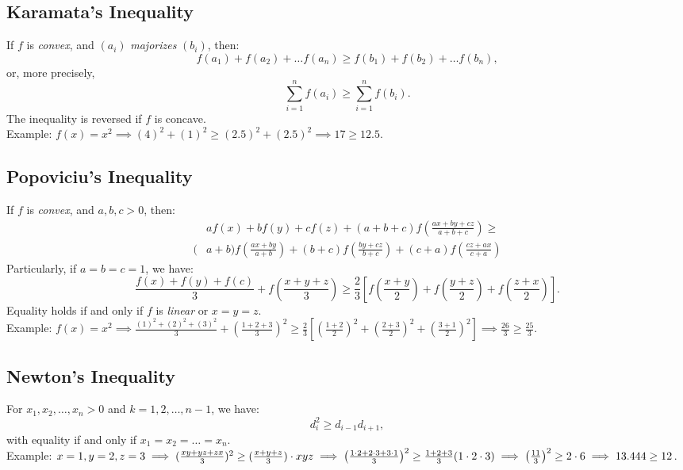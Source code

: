 \documentclass[a4paper,11pt]{article}
\begin{document}
\subsection{Karamata's Inequality}
\begin{tcolorbox}
    If $f$ is \emph{convex}, and $(a_i)$ \emph{majorizes} $(b_i)$, then:
    \[
    f(a_1) + f(a_2) + \dots f(a_n) \geq f(b_1) + f(b_2) + \dots f(b_n),
    \]
    or, more precisely,
    \[
    \sum_{i=1}^n f(a_i) \geq \sum_{i=1}^n f(b_i).
    \]
    The inequality is reversed if $f$ is concave. \\[6pt]
    Example: $\textstyle f(x) = x^2 \implies (4)^2 + (1)^2 \geq (2.5)^2 + (2.5)^2 \implies 17 \geq 12.5$.
\end{tcolorbox}


\subsection{Popoviciu's Inequality}
\begin{tcolorbox}
    If $f$ is \emph{convex}, and $a, b, c > 0$, then:
    \begin{align*}
        &af(x) + bf(y) + cf(z) + (a+b+c) f\left(\frac{ax + by + cz}{a+b+c}\right) \geq \\[4pt]
        (&a+b) f\left(\frac{ax + by}{a+b}\right) + (b+c) f\left(\frac{by+cz}{b+c}\right) + (c+a) f\left(\frac{cz+ax}{c+a}\right)
    \end{align*}
    Particularly, if $a=b=c=1$, we have:
    \[
    \frac{f(x) + f(y) + f(c)}{3} + f \left( \frac{x+y+z}{3} \right) \geq \frac{2}{3} \left[ f\left(\frac{x+y}{2}\right) + f \left(\frac{y+z}{2}\right) + f \left(\frac{z+x}{2}\right) \right].
    \]
    Equality holds if and only if $f$ is \emph{linear} or $x=y=z$. \\[6pt]
    Example: $\textstyle f(x) = x^2 \implies \frac{(1)^2 + (2)^2 + (3)^2}{3} + \left(\frac{1+2+3}{3}\right)^2 \geq \frac{2}{3} \left[ \left(\frac{1+2}{2}\right)^2 + \left(\frac{2+3}{2}\right)^2 + \left(\frac{3+1}{2}\right)^2 \right] \implies \frac{26}{3} \geq \frac{25}{3}$.
\end{tcolorbox}


\subsection{Newton's Inequality}
\begin{tcolorbox}
    For $x_1, x_2, \dots, x_n > 0$ and $k=1,2,\dots,n-1$, we have:
    \[
    d_i^2 \geq d_{i-1}d_{i+1},
    \]
    with equality if and only if $x_1 = x_2 = \dots = x_n$. \\[6pt]
    Example: $\textstyle x=1, y=2, z=3 \implies (\frac{xy + yz + zx}{3})^2 \geq (\frac{x+y+z}{3})\cdot xyz \\[6pt]
    \implies \left(\frac{1\cdot2 + 2\cdot3 + 3\cdot1}{3}\right)^2 \geq \frac{1+2+3}{3} (1\cdot2\cdot3) \implies \left(\frac{11}{3}\right)^2 \geq 2 \cdot 6 \implies 13.444 \geq 12$.
\end{tcolorbox}
\end{document}
